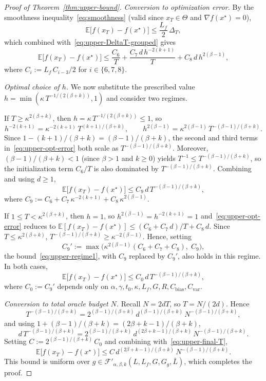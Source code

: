 \documentclass[10pt,a4paper]{amsart}
\renewcommand{\geq}{\geqslant}
\renewcommand{\leq}{\leqslant}
\begin{document}
\begin{proof}[Proof of Theorem~\ref{thm:upper-bound}]
\medskip
\noindent\textit{Conversion to optimization error.}
By the smoothness inequality~\eqref{eq:smoothness} (valid since 
$x_T\in\Theta$ and $\nabla f(x^\star)=0$),
\[
\mathbb{E}\bigl[f(x_T)-f(x^\star)\bigr]
\leq\frac{L_f}{2}\,\Delta_T,
\]
which combined with~\eqref{eq:upper-DeltaT-grouped} gives
\begin{equation}
\label{eq:upper-opt-error}
\mathbb{E}\bigl[f(x_T)-f(x^\star)\bigr]
\leq\frac{C_6}{T}+\frac{C_7\,d\,h^{-2(k+1)}}{T}
+C_8\,d\,h^{2(\beta-1)},
\end{equation}
where $C_i:=L_f\,C_{i-3}/2$ for $i\in\{6,7,8\}$.

\medskip
\noindent\textit{Optimal choice of $h$.}
We now substitute the prescribed value 
$h=\min(\kappa\,T^{-1/(2(\beta+k))},1)$ and consider two regimes.

If $T\geq\kappa^{2(\beta+k)}$, then 
$h=\kappa\,T^{-1/(2(\beta+k))}\leq 1$, so
\[
h^{-2(k+1)}=\kappa^{-2(k+1)}\,T^{(k+1)/(\beta+k)},
\qquad
h^{2(\beta-1)}=\kappa^{2(\beta-1)}\,T^{-(\beta-1)/(\beta+k)}.
\]
Since $1-(k+1)/(\beta+k)=(\beta-1)/(\beta+k)$, the second and 
third terms in~\eqref{eq:upper-opt-error} both scale as 
$T^{-(\beta-1)/(\beta+k)}$. Moreover, $(\beta-1)/(\beta+k)<1$ 
(since $\beta>1$ and $k\geq 0$) yields 
$T^{-1}\leq T^{-(\beta-1)/(\beta+k)}$, so the initialization term 
$C_6/T$ is also dominated by $T^{-(\beta-1)/(\beta+k)}$. Combining 
and using $d\geq 1$,
\begin{equation}
\label{eq:upper-regime1}
\mathbb{E}\bigl[f(x_T)-f(x^\star)\bigr]
\leq C_9\,d\,T^{-(\beta-1)/(\beta+k)},
\end{equation}
where 
$C_9:=C_6+C_7\,\kappa^{-2(k+1)}+C_8\,\kappa^{2(\beta-1)}$.

If $1\leq T<\kappa^{2(\beta+k)}$, then $h=1$, so 
$h^{2(\beta-1)}=h^{-2(k+1)}=1$ 
and~\eqref{eq:upper-opt-error} reduces to 
$\mathbb{E}[f(x_T)-f(x^\star)]\leq(C_6+C_7\,d)/T+C_8\,d$. Since 
$T\leq\kappa^{2(\beta+k)}$, 
$T^{-(\beta-1)/(\beta+k)}\geq\kappa^{-2(\beta-1)}$. Hence, setting
\[
C_9':=\max\bigl(\kappa^{2(\beta-1)}(C_6+C_7+C_8),\;C_9\bigr),
\]
the bound~\eqref{eq:upper-regime1}, with $C_9$ replaced by $C_9'$, 
also holds in this regime. In both cases,
\begin{equation}
\label{eq:upper-final-T}
\mathbb{E}\bigl[f(x_T)-f(x^\star)\bigr]
\leq C_0\,d\,T^{-(\beta-1)/(\beta+k)},
\end{equation}
where $C_0:=C_9'$ depends only on 
$\alpha,\gamma,t_0,\kappa,L_f,G,R,C_{\mathrm{bias}},C_{\mathrm{var}}$.

\medskip
\noindent\textit{Conversion to total oracle budget $N$.}
Recall $N=2dT$, so $T=N/(2d)$. Hence
\[
T^{-(\beta-1)/(\beta+k)}
=2^{(\beta-1)/(\beta+k)}\,d^{(\beta-1)/(\beta+k)}\,
N^{-(\beta-1)/(\beta+k)},
\]
and using $1+(\beta-1)/(\beta+k)=(2\beta+k-1)/(\beta+k)$,
\[
d\,T^{-(\beta-1)/(\beta+k)}
=2^{(\beta-1)/(\beta+k)}\,d^{(2\beta+k-1)/(\beta+k)}\,
N^{-(\beta-1)/(\beta+k)}.
\]
Setting $C:=2^{(\beta-1)/(\beta+k)}\,C_0$ and combining 
with~\eqref{eq:upper-final-T},
\[
\mathbb{E}\bigl[f(x_T)-f(x^\star)\bigr]
\leq C\,d^{(2\beta+k-1)/(\beta+k)}\,N^{-(\beta-1)/(\beta+k)}.
\]
This bound is uniform over 
$g\in\mathcal{F}'_{\alpha,\beta,k}(L,L_f,G,G_g,\bar{L})$, which 
completes the proof.
\end{proof}
\end{document}
